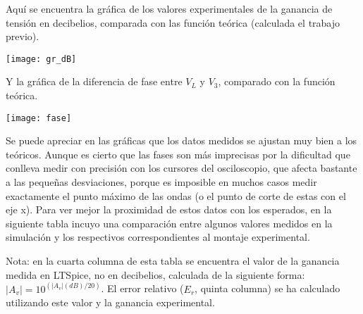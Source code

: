 \documentclass{article}
\begin{document}
Aquí se encuentra la gráfica de los valores experimentales de la ganancia de tensión en decibelios, comparada con las función teórica (calculada el trabajo previo).

\begin{center}
\texttt{[image: gr\_dB]}\\
\end{center}

\cleardoublepage

Y la gráfica de la diferencia de fase entre $V_L$ y $V_{3}$, comparado con la función teórica.

\begin{center}
\texttt{[image: fase]}\\
\end{center}

Se puede apreciar en las gráficas que los datos medidos se ajustan muy bien a los teóricos. Aunque es cierto que las fases son más imprecisas por la dificultad que conlleva medir con precisión con los cursores del osciloscopio, que afecta bastante a las pequeñas desviaciones, porque es imposible en muchos casos medir exactamente el punto máximo de las ondas (o el punto de corte de estas con el eje x). Para ver mejor la proximidad de estos datos con los esperados, en la siguiente tabla incuyo una comparación entre algunos valores medidos en la simulación y los respectivos correspondientes al montaje experimental.

Nota: en la cuarta columna de esta tabla se encuentra el valor de la ganancia medida en LTSpice, no en decibelios, calculada de la siguiente forma: $|A_v|=10^{({|A_v|(dB)}/{20})}$. El error relativo ($E_r$, quinta columna) se ha calculado utilizando este valor y la ganancia experimental.
\end{document}
